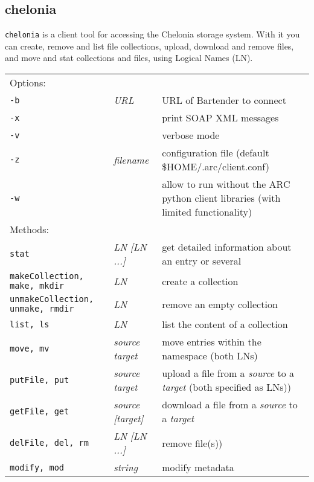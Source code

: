 \subsection{chelonia}\label{sec:chelonia}

\texttt{chelonia} is a client tool for
accessing the Chelonia storage system. With it you can
create, remove and list file collections, upload, download and remove files,
and move and stat collections and files, using Logical Names (LN).
\hspace*{0.5cm}
\begin{shaded}
\end{shaded}
\begin{longtable}{llp{8cm}}
   Options:&&\\
   \texttt{-b} & \textit{URL} & URL of Bartender to connect\\
   \texttt{-x} && print SOAP XML messages\\
   \texttt{-v} && verbose mode\\
   \texttt{-z}&\textit{filename}& configuration file (default {\$}HOME/.arc/client.conf)\\
   \texttt{-w} && allow to run without the ARC python client libraries (with limited functionality)\\
   Methods:&&\\
   \texttt{stat} &\textit{LN [LN ...]}& get detailed information about an entry or several\\
   \texttt{makeCollection, make, mkdir} &\textit{LN}& create a collection\\
   \texttt{unmakeCollection, unmake, rmdir} &\textit{LN}& remove an empty collection\\
   \texttt{list, ls} &\textit{LN}& list the content of a collection\\
   \texttt{move, mv} &\textit{source target}& move entries within the namespace (both LNs)\\
   \texttt{putFile, put} &\textit{source target}& upload a file from a \textit{source} to a \textit{target} (both specified as LNs))\\
   \texttt{getFile, get} &\textit{source [target]}& download a file from a \textit{source} to a \textit{target}\\
   \texttt{delFile, del, rm} &\textit{LN [LN ...]}& remove file(s))\\
   \texttt{modify, mod} &\textit{string}& modify metadata\\

\end{longtable}
